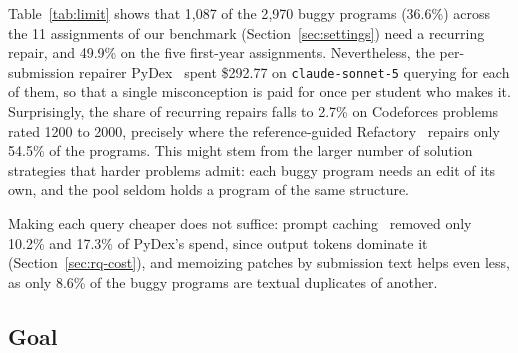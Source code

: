 \documentclass[acmsmall,screen,review,anonymous,nonacm]{acmart}
\newcommand{\cs}{\texttt{claude-sonnet-5}\xspace}
\begin{document}
Table~\ref{tab:limit} shows that 1{,}087 of the 2{,}970 buggy programs (36.6\%) across the 11 assignments of our benchmark (Section~\ref{sec:settings}) need a recurring repair, and 49.9\% on the five first-year assignments. Nevertheless, the per-submission repairer PyDex~\cite{zhang2024pydex} spent \$292.77 on \cs querying for each of them, so that a single misconception is paid for once per student who makes it. Surprisingly, the share of recurring repairs falls to 2.7\% on Codeforces problems rated 1200 to 2000, precisely where the reference-guided Refactory~\cite{hu2019re} repairs only 54.5\% of the programs. This might stem from the larger number of solution strategies that harder problems admit: each buggy program needs an edit of its own, and the pool seldom holds a program of the same structure.

Making each query cheaper does not suffice: prompt caching~\cite{anthropiccaching,openaicaching} removed only 10.2\% and 17.3\% of PyDex's spend, since output tokens dominate it (Section~\ref{sec:rq-cost}), and memoizing patches by submission text helps even less, as only 8.6\% of the buggy programs are textual duplicates of another.

\subsection{Goal}
\label{sec:goal}
\end{document}
